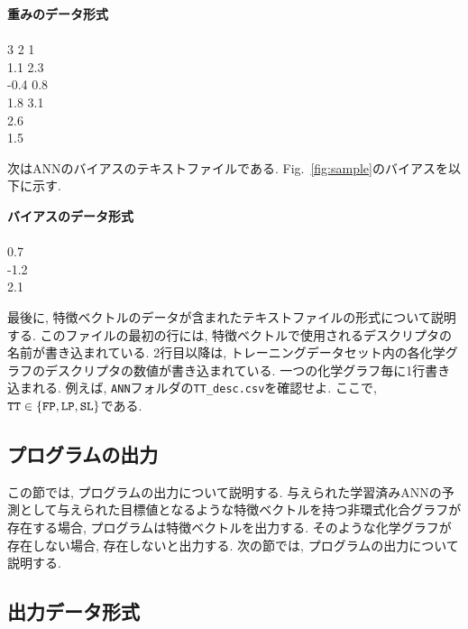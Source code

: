 \documentclass[11pt, titlepage, dvipdfmx, twoside]{jarticle}
\newcommand{\target}{目標}
\begin{document}
\bigskip

\begin{oframed}
{\bf 重みのデータ形式}\\\\
3 2 1\\
1.1 2.3\\
-0.4 0.8\\
1.8 3.1\\
2.6\\
1.5\\
\end{oframed}

\bigskip


次はANNのバイアスのテキストファイルである. 
Fig.~\ref{fig:sample}のバイアスを以下に示す. 

\bigskip

\begin{oframed}
{\bf バイアスのデータ形式}\\\\
0.7\\
-1.2\\
2.1\\
\end{oframed}

\bigskip

最後に,  特徴ベクトルのデータが含まれたテキストファイルの形式について説明する. 
このファイルの最初の行には, 特徴ベクトルで使用されるデスクリプタの名前が書き込まれている. 
2行目以降は, トレーニングデータセット内の各化学グラフのデスクリプタの数値が書き込まれている. 
一つの化学グラフ毎に1行書き込まれる. 
例えば, {\tt ANN}フォルダの{\tt TT\_desc.csv}を確認せよ. 
ここで, ${\tt TT}\in \{{\tt FP, LP, SL}\}$である. 



\subsection{プログラムの出力}
\label{sec:section3_3}

この節では, プログラムの出力について説明する. 
与えられた学習済みANNの予測として与えられた\target 値となるような特徴ベクトルを持つ非環式化合グラフが存在する場合, プログラムは特徴ベクトルを出力する. 
そのような化学グラフが存在しない場合, 存在しないと出力する. 
次の節では, プログラムの出力について説明する. 


\subsection{出力データ形式}
\label{sec:section3_4}
\end{document}
